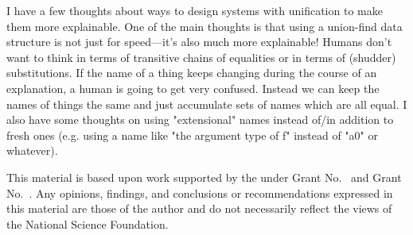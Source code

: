 \documentclass[sigplan, screen]{acmart}\settopmatter{printccs=false,printacmref=false}
\begin{document}
I have a few thoughts about ways to design systems with unification to make them more explainable.  One of the main thoughts is that using a union-find data structure is not just for speed---it's also much more explainable!  Humans don't want to think in terms of transitive chains of equalities or in terms of (shudder) substitutions.  If the name of a thing keeps changing during the course of an explanation, a human is going to get very confused.  Instead we can keep the names of things the same and just accumulate sets of names which are all equal.  I also have some thoughts on using "extensional" names instead of/in addition to fresh ones (e.g. using a name like "the argument type of f" instead of "a0" or whatever).



\begin{acks}                            %
  This material is based upon work supported by the
   under Grant
  No.~ and Grant
  No.~.  Any opinions, findings, and
  conclusions or recommendations expressed in this material are those
  of the author and do not necessarily reflect the views of the
  National Science Foundation.
\end{acks}


%
\end{document}
